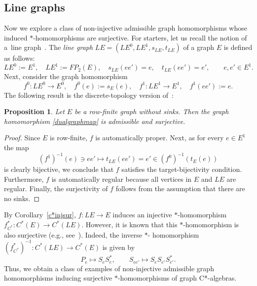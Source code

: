 \documentclass[12pt,times,a4paper]{amsart}
\newtheorem{proposition}[theorem]{Proposition}
\numberwithin{equation}{section}
\numberwithin{equation}{section}
\begin{document}
\subsection{Line graphs}
 Now we explore a class of non-injective admissible graph homomorphisms whose induced $*$-homomorphisms are surjective.
 For starters, let us recall the notion of a~line graph~\cite{hn-60}. 
The {\em line graph} $LE=(LE^0,LE^1,s_{LE},t_{LE})$ of a graph $E$ is defined as follows:
\begin{equation}
LE^0:=E^1,\quad LE^1:=FP_2(E),\quad s_{LE}(ee')=e,\quad t_{LE}(ee')=e',\qquad e,e'\in E^1.
\end{equation} 
Next, consider the graph homomorphism
\begin{equation}\label{dualgraphmap}
f^0:LE^0\longrightarrow E^0,\quad f^0(e):=s_E(e),\quad f^1:LE^1\longrightarrow E^1,\quad f^1(ee'):=e.
\end{equation}
The following result is the discrete-topology version of~\cite[Proposition~2.6]{t-k21}: 
\begin{proposition}
Let $E$ be a row-finite graph without sinks. Then the graph homomorphism \eqref{dualgraphmap} is admissible and surjective. 
\end{proposition}
\begin{proof}
Since $E$ is row-finite, $f$ is automatically proper. 
Next, as for every $e\in E^1$ the map
\begin{equation}
(f^1)^{-1}(e)\ni ee'\longmapsto t_{LE}(ee')=e' \in (f^0)^{-1}(t_E(e))
\end{equation}
is clearly bijective, we conclude that $f$ satisfies the target-bijectivity condition. Furthermore, $f$ is automatically regular 
because all vertices in $E$ and $LE$ are regular. Finally, the surjectivity of $f$ follows from the assumption that there are no sinks.
\end{proof}
\noindent By Corollary~\ref{c*injsur}, $f:LE\to E$ induces an injective $*$-homomorphism $f^*_{C^*}:C^*(E)\to C^*(LE)$. 
However, it is known that this $*$-homomorphism is also surjective (e.g., see~\cite[Corollary~2.6]{i-r05}). Indeed, the inverse $*$-
homomorphism $(f^*_{C^*})^{-1}:C^*(LE)\longrightarrow C^*(E)$ is given by
\begin{equation}
P_e\longmapsto S_eS_e^*,\qquad S_{ee'}\longmapsto S_e S_{e'}S_{e'}^*.
\end{equation}
Thus, we obtain a class of examples of non-injective admissible graph homomorphisms
inducing surjective $*$-homomorphisms of graph C*-algebras.
\end{document}
